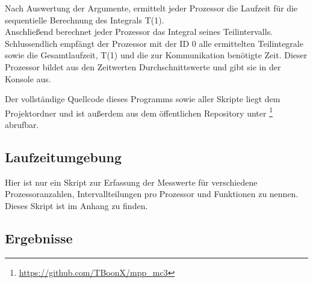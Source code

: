 \documentclass[a4paper,12pt]{scrartcl}
\begin{document}
Nach Auswertung der Argumente, ermittelt jeder Prozessor die Laufzeit f\"ur die sequentielle Berechnung des Integrals T(1).\\
Anschlie\ss{}end berechnet jeder Prozessor das Integral seines Teilintervalls.
Schlussendlich empf\"angt der Prozessor mit der ID 0 alle ermittelten Teilintegrale sowie die Gesamtlaufzeit, T(1) und die zur
Kommunikation ben\"otigte Zeit.
Dieser Prozessor bildet aus den Zeitwerten Durchschnittswerte und gibt sie in der Konsole aus.

Der vollst\"andige Quellcode dieses Programms sowie aller Skripte liegt dem Projektordner und ist au\ss{}erdem aus dem \"offentlichen Repository unter
\footnote{\url{https://github.com/TBoonX/mpp_mc3}} abrufbar.

\subsection{Laufzeitumgebung}
Hier ist nur ein Skript zur Erfassung der Messwerte f\"ur verschiedene Prozessoranzahlen, Intervallteilungen pro Prozessor und Funktionen zu nennen.\\
Dieses Skript ist im Anhang  zu finden.\\

\clearpage
\subsection{Ergebnisse}
\end{document}
